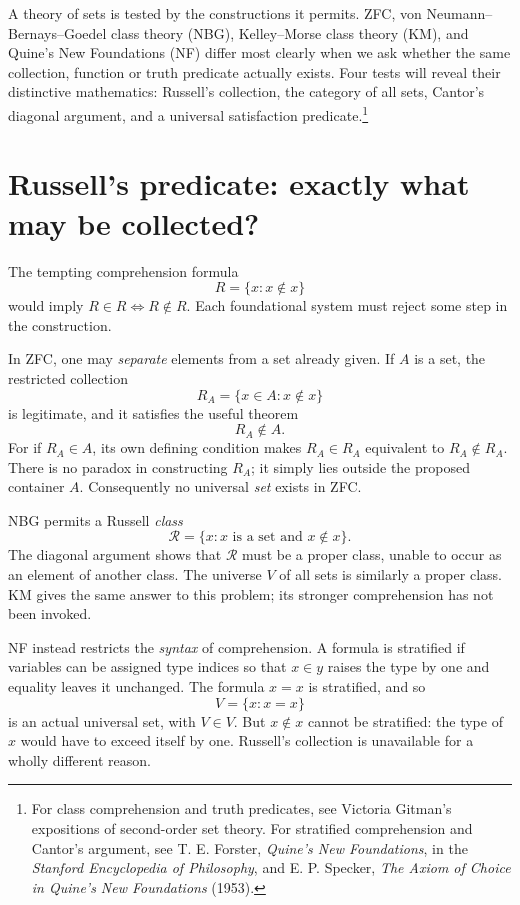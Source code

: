 
A theory of sets is tested by the constructions it permits. ZFC, von Neumann--Bernays--Goedel class theory (NBG), Kelley--Morse class theory (KM), and Quine's New Foundations (NF) differ most clearly when we ask whether the same collection, function or truth predicate actually exists. Four tests will reveal their distinctive mathematics: Russell's collection, the category of all sets, Cantor's diagonal argument, and a universal satisfaction predicate.\footnote{For class comprehension and truth predicates, see Victoria Gitman's expositions of second-order set theory. For stratified comprehension and Cantor's argument, see T. E. Forster, \emph{Quine's New Foundations}, in the \emph{Stanford Encyclopedia of Philosophy}, and E. P. Specker, \emph{The Axiom of Choice in Quine's New Foundations} (1953).}

\section{Russell's predicate: exactly what may be collected?}

The tempting comprehension formula
\[
 R=\{x:x\notin x\}
\]
would imply \(R\in R\iff R\notin R\). Each foundational system must reject some step in the construction.

In ZFC, one may \emph{separate} elements from a set already given. If \(A\) is a set, the restricted collection
\[
 R_A=\{x\in A:x\notin x\}
\]
is legitimate, and it satisfies the useful theorem
\[
 \boxed{R_A\notin A}.
\]
For if \(R_A\in A\), its own defining condition makes \(R_A\in R_A\) equivalent to \(R_A\notin R_A\). There is no paradox in constructing \(R_A\); it simply lies outside the proposed container \(A\). Consequently no universal \emph{set} exists in ZFC.

NBG permits a Russell \emph{class}
\[
 \mathcal R=\{x:x\text{ is a set and }x\notin x\}.
\]
The diagonal argument shows that \(\mathcal R\) must be a proper class, unable to occur as an element of another class. The universe \(V\) of all sets is similarly a proper class. KM gives the same answer to this problem; its stronger comprehension has not been invoked.

NF instead restricts the \emph{syntax} of comprehension. A formula is stratified if variables can be assigned type indices so that \(x\in y\) raises the type by one and equality leaves it unchanged. The formula \(x=x\) is stratified, and so
\[
 \boxed{V=\{x:x=x\}}
\]
is an actual universal set, with \(V\in V\). But \(x\notin x\) cannot be stratified: the type of \(x\) would have to exceed itself by one. Russell's collection is unavailable for a wholly different reason.

